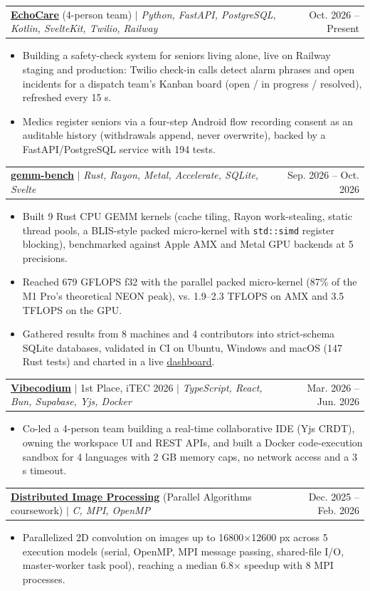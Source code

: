 \documentclass[a4paper, 10pt]{article}
\makeatletter
\newcommand{\resumeItem}[1]{ \item\small{ {#1 \vspace{-2pt}} } }
\newcommand{\resumeProjectHeading}[2]{ \item
\begin{tabular*}{0.97\textwidth}{l@{\extracolsep{\fill}}r}
	\small#1 & #2 \\
\end{tabular*}
\vspace{-2pt}
}
\newcommand{\resumeItemListStart}{\begin{itemize}}
\newcommand{\resumeItemListEnd}{\end{itemize}
\vspace{-2pt}}
\makeatother
\begin{document}
	\resumeProjectHeading
	{\textbf{\href{https://github.com/paulhondola/EchoCare}{\underline{EchoCare}}} (4-person team) $|$ \emph{Python, FastAPI, PostgreSQL, Kotlin, SvelteKit, Twilio, Railway}}{Oct. 2026 -- Present}
	\resumeItemListStart
		\resumeItem{Building a safety-check system for seniors living alone, live on Railway staging and production: Twilio check-in calls detect alarm phrases and open incidents for a dispatch team's Kanban board (open / in progress / resolved), refreshed every 15 s.}
		\resumeItem{Medics register seniors via a four-step Android flow recording consent as an auditable history (withdrawals append, never overwrite), backed by a FastAPI/PostgreSQL service with 194 tests.}
	\resumeItemListEnd

	\resumeProjectHeading
	{\textbf{\href{https://github.com/paulhondola/gemm-bench}{\underline{gemm-bench}}} $|$ \emph{Rust, Rayon, Metal, Accelerate, SQLite, Svelte}}{Sep. 2026 -- Oct. 2026}
	\resumeItemListStart
		\resumeItem{Built 9 Rust CPU GEMM kernels (cache tiling, Rayon work-stealing, static thread pools, a BLIS-style packed micro-kernel with \texttt{std::simd} register blocking), benchmarked against Apple AMX and Metal GPU backends at 5 precisions.}
		\resumeItem{Reached 679 GFLOPS f32 with the parallel packed micro-kernel (87\% of the M1 Pro's theoretical NEON peak), vs. 1.9--2.3 TFLOPS on AMX and 3.5 TFLOPS on the GPU.}
		\resumeItem{Gathered results from 8 machines and 4 contributors into strict-schema SQLite databases, validated in CI on Ubuntu, Windows and macOS (147 Rust tests) and charted in a live \href{https://paulhondola.github.io/gemm-bench/}{\underline{dashboard}}.}
	\resumeItemListEnd

	\resumeProjectHeading
	{\textbf{\href{https://github.com/paulhondola/vibecodium}{\underline{Vibecodium}}} $|$ 1st Place, iTEC 2026 $|$ \emph{TypeScript, React, Bun, Supabase, Yjs, Docker}}{Mar. 2026 -- Jun. 2026}
	\resumeItemListStart
		\resumeItem{Co-led a 4-person team building a real-time collaborative IDE (Yjs CRDT), owning the workspace UI and REST APIs, and built a Docker code-execution sandbox for 4 languages with 2 GB memory caps, no network access and a 3 s timeout.}
	\resumeItemListEnd

	\resumeProjectHeading
	{\textbf{\href{https://github.com/paulhondola/MPI-OpenMP-Image-Processing}{\underline{Distributed Image Processing}}} (Parallel Algorithms coursework) $|$ \emph{C, MPI, OpenMP}}{Dec. 2025 -- Feb. 2026}
	\resumeItemListStart
		\resumeItem{Parallelized 2D convolution on images up to 16800$\times$12600 px across 5 execution models (serial, OpenMP, MPI message passing, shared-file I/O, master-worker task pool), reaching a median 6.8$\times$ speedup with 8 MPI processes.}
	\resumeItemListEnd
\end{document}
